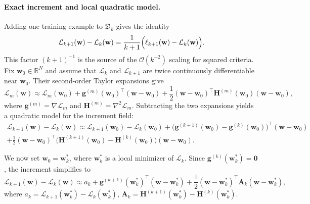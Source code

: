 \documentclass{article}
\begin{document}
\paragraph{Exact increment and local quadratic model.}
Adding one training example to $\mathfrak D_k$ gives the identity
\begin{equation}
\label{eq:loss-increment-exact}
\mathcal L_{k+1}(\mathbf w)-\mathcal L_k(\mathbf w)
=
\frac{1}{k+1}\Bigl(\ell_{k+1}(\mathbf w)-\mathcal L_k(\mathbf w)\Bigr).
\end{equation}
This factor $(k+1)^{-1}$ is the source of the $\mathcal O(k^{-2})$ scaling for squared criteria. Fix $\mathbf w_0\in\mathbb R^N$ and assume that $\mathcal L_k$ and $\mathcal L_{k+1}$ are twice continuously differentiable near $\mathbf w_0$. Their second-order Taylor expansions give
\begin{equation}
\label{eq:taylor-quadratic}
\mathcal L_m(\mathbf w)
\approx
\mathcal L_m(\mathbf w_0)
+
\mathbf g^{(m)}(\mathbf w_0)^\top(\mathbf w-\mathbf w_0)
+
\frac12(\mathbf w-\mathbf w_0)^\top \mathbf H^{(m)}(\mathbf w_0)(\mathbf w-\mathbf w_0),
\end{equation}
where $\mathbf g^{(m)}=\nabla \mathcal L_m$ and $\mathbf H^{(m)}=\nabla^2 \mathcal L_m$. Subtracting the two expansions yields a quadratic model for the increment field:
\begin{multline}
\label{eq:loss-diff-second}
\mathcal L_{k+1}(\mathbf w)-\mathcal L_k(\mathbf w)
\approx
\mathcal L_{k+1}(\mathbf w_0)-\mathcal L_k(\mathbf w_0)
+
\bigl(\mathbf g^{(k+1)}(\mathbf w_0)-\mathbf g^{(k)}(\mathbf w_0)\bigr)^\top(\mathbf w-\mathbf w_0)
\\
+
\frac12(\mathbf w-\mathbf w_0)^\top
\bigl(\mathbf H^{(k+1)}(\mathbf w_0)-\mathbf H^{(k)}(\mathbf w_0)\bigr)
(\mathbf w-\mathbf w_0).
\end{multline}

We now set $\mathbf w_0=\mathbf w_k^*$, where $\mathbf w_k^*$ is a local minimizer of $\mathcal L_k$. Since $\mathbf g^{(k)}(\mathbf w_k^*)=\mathbf 0$, the increment simplifies to
\begin{equation}
\label{eq:loss-diff-minimum}
\mathcal L_{k+1}(\mathbf w)-\mathcal L_k(\mathbf w)
\approx
a_k
+
\mathbf g^{(k+1)}(\mathbf w_k^*)^\top(\mathbf w-\mathbf w_k^*)
+
\frac12(\mathbf w-\mathbf w_k^*)^\top
\mathbf A_k
(\mathbf w-\mathbf w_k^*),
\end{equation}
where $a_k=\mathcal L_{k+1}(\mathbf w_k^*)-\mathcal L_k(\mathbf w_k^*)$, $\mathbf A_k=\mathbf H^{(k+1)}(\mathbf w_k^*)-\mathbf H^{(k)}(\mathbf w_k^*)$.
\end{document}

